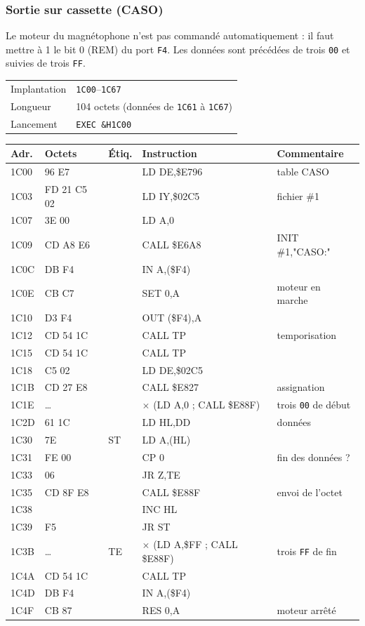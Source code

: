 \documentclass[a4paper,10pt]{article}
\makeatletter
\newcommand{\hex}[1]{\texttt{#1}}
\newcommand{\fiche}[3]{%
  \begin{center}\small
  \begin{tabular}{@{}ll@{}}
  \toprule
  Implantation & #1 \\
  Longueur & #2 \\
  Lancement & #3 \\
  \bottomrule
  \end{tabular}
  \end{center}}
\newenvironment{asm}
  {\small\begin{longtable}{@{}>{\ttfamily}l>{\ttfamily}l>{\ttfamily}l>{\ttfamily}l>{\raggedright\arraybackslash}p{6.2cm}@{}}
   \toprule
   \normalfont\bfseries Adr. & \normalfont\bfseries Octets & \normalfont\bfseries Étiq. & \normalfont\bfseries Instruction & \textbf{Commentaire}\\
   \midrule\endhead
   \bottomrule\endfoot}
  {\end{longtable}}
\makeatother
\begin{document}
\subsubsection*{Sortie sur cassette (CASO)}
Le moteur du magnétophone n'est pas commandé automatiquement : il faut mettre
à 1 le bit 0 (REM) du port \hex{F4}. Les données sont précédées de trois
\hex{00} et suivies de trois \hex{FF}.
\fiche{\hex{1C00}--\hex{1C67}}{104 octets (données de \hex{1C61} à \hex{1C67})}{\texttt{EXEC \&H1C00}}
\begin{asm}
1C00 & 11 96 E7 & & LD DE,\$E796   & table CASO \\
1C03 & FD 21 C5 02 & & LD IY,\$02C5 & fichier \#1 \\
1C07 & 3E 00    & & LD A,0         & \\
1C09 & CD A8 E6 & & CALL \$E6A8    & INIT \#1,"CASO:" \\
1C0C & DB F4    & & IN A,(\$F4)    & \\
1C0E & CB C7    & & SET 0,A        & moteur en marche \\
1C10 & D3 F4    & & OUT (\$F4),A   & \\
1C12 & CD 54 1C & & CALL TP        & temporisation \\
1C15 & CD 54 1C & & CALL TP        & \\
1C18 & 11 C5 02 & & LD DE,\$02C5   & \\
1C1B & CD 27 E8 & & CALL \$E827    & assignation \\
1C1E & \dots    & & 3 $\times$ (LD A,0 ; CALL \$E88F) & trois \hex{00} de début \\
1C2D & 21 61 1C & & LD HL,DD       & données \\
1C30 & 7E       & ST & LD A,(HL)   & \\
1C31 & FE 00    & & CP 0           & fin des données ? \\
1C33 & 28 06    & & JR Z,TE        & \\
1C35 & CD 8F E8 & & CALL \$E88F    & envoi de l'octet \\
1C38 & 23       & & INC HL         & \\
1C39 & 18 F5    & & JR ST          & \\
1C3B & \dots    & TE & 3 $\times$ (LD A,\$FF ; CALL \$E88F) & trois \hex{FF} de fin \\
1C4A & CD 54 1C & & CALL TP        & \\
1C4D & DB F4    & & IN A,(\$F4)    & \\
1C4F & CB 87    & & RES 0,A        & moteur arrêté \\

\end{asm}
\end{document}
